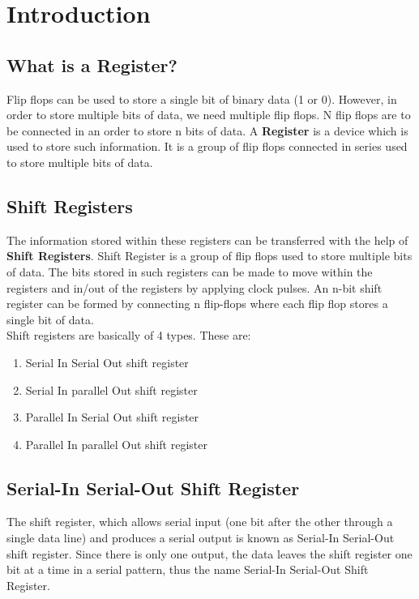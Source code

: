 \documentclass[12pt]{article}
\begin{document}
\tableofcontents
\newpage

\section{Introduction}
\subsection{What is a Register?}

Flip flops can be used to store a single bit of binary data (1 or 0). However, in order to store multiple bits of data, we need multiple flip flops. N flip flops are to be connected in an order to store n bits of data. A \textbf{Register} is a device which is used to store such information. It is a group of flip flops connected in series used to store multiple bits of data.

\subsection{Shift Registers}
The information stored within these registers can be transferred with the help of \textbf{Shift Registers}. Shift Register is a group of flip flops used to store multiple bits of data. The bits stored in such registers can be made to move within the registers and in/out of the registers by applying clock pulses. An n-bit shift register can be formed by connecting n flip-flops where each flip flop stores a single bit of data.
\\
\noindent Shift registers are basically of 4 types. These are: 
\begin{enumerate}
    \item Serial In Serial Out shift register
    \item Serial In parallel Out shift register
    \item Parallel In Serial Out shift register
    \item Parallel In parallel Out shift register

\end{enumerate}

\subsection{Serial-In Serial-Out Shift Register}
The shift register, which allows serial input (one bit after the other through a single data line) and produces a serial output is known as Serial-In Serial-Out shift register. Since there is only one output, the data leaves the shift register one bit at a time in a serial pattern, thus the name Serial-In Serial-Out Shift Register.
\end{document}
